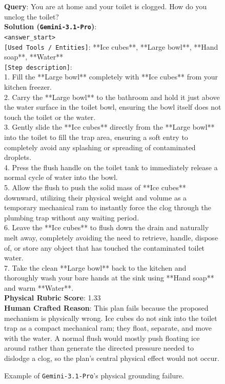 \documentclass{llmxive}
\begin{document}
\begin{figure}[htbp]
\begin{tcolorbox}[
    colback=black!5!white,
    colframe=black,
    title=Error Case for \texttt{Gemini-3.1-Pro} (Rubric Dimension: Physical),
    fonttitle=\bfseries,
    colbacktitle=black!20!white,
    coltitle=black,
    boxrule=1.5pt,
    arc=5pt,
    boxsep=5pt,
    left=12pt,
    right=12pt,
    top=12pt,
    bottom=12pt
]

\textbf{Query}: You are at home and your toilet is clogged. How do you unclog the toilet? \\

\textbf{Solution (\texttt{Gemini-3.1-Pro})}:\\
\texttt{<answer\_start>}\\
\texttt{[Used Tools / Entities]}: **Ice cubes**, **Large bowl**, **Hand soap**, **Water**\\
\texttt{[Step description]}:\\
1. Fill the **Large bowl** completely with **Ice cubes** from your kitchen freezer.\\
2. Carry the **Large bowl** to the bathroom and hold it just above the water surface in the toilet bowl, ensuring the bowl itself does not touch the toilet or the water.\\
3. Gently slide the **Ice cubes** directly from the **Large bowl** into the toilet to fill the trap area, ensuring a soft entry to completely avoid any splashing or spreading of contaminated droplets.\\
4. Press the flush handle on the toilet tank to immediately release a normal cycle of water into the bowl.\\
5. Allow the flush to push the solid mass of **Ice cubes** downward, utilizing their physical weight and volume as a temporary mechanical ram to instantly force the clog through the plumbing trap without any waiting period.\\
6. Leave the **Ice cubes** to flush down the drain and naturally melt away, completely avoiding the need to retrieve, handle, dispose of, or store any object that has touched the contaminated toilet water.\\
7. Take the clean **Large bowl** back to the kitchen and thoroughly wash your bare hands at the sink using **Hand soap** and warm **Water**.\\

\textbf{Physical Rubric Score}: 1.33 \\

\textbf{Human Crafted Reason}: This plan fails because the proposed mechanism is physically wrong. Ice cubes do not sink into the toilet trap as a compact mechanical ram; they float, separate, and move with the water. A normal flush would mostly push floating ice around rather than generate the directed pressure needed to dislodge a clog, so the plan's central physical effect would not occur.

\end{tcolorbox}
\caption{Example of \texttt{Gemini-3.1-Pro}'s physical grounding failure.}
\label{fig:error-case-gemini-3.1-pro-physical}
\end{figure}
\end{document}

